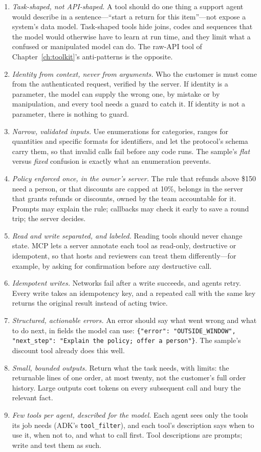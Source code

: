 \begin{enumerate}[leftmargin=2.0em, itemsep=3pt]
  \item \emph{Task-shaped, not API-shaped.} A tool should do one thing a support agent would describe in a sentence---``start a return for this item''---not expose a system's data model. Task-shaped tools hide joins, codes and sequences that the model would otherwise have to learn at run time, and they limit what a confused or manipulated model can do. The raw-API tool of Chapter~\ref{ch:toolkit}'s anti-patterns is the opposite.
  \item \emph{Identity from context, never from arguments.} Who the customer is must come from the authenticated request, verified by the server. If identity is a parameter, the model can supply the wrong one, by mistake or by manipulation, and every tool needs a guard to catch it. If identity is not a parameter, there is nothing to guard.
  \item \emph{Narrow, validated inputs.} Use enumerations for categories, ranges for quantities and specific formats for identifiers, and let the protocol's schema carry them, so that invalid calls fail before any code runs. The sample's \emph{flat} versus \emph{fixed} confusion is exactly what an enumeration prevents.
  \item \emph{Policy enforced once, in the owner's server.} The rule that refunds above \$150 need a person, or that discounts are capped at 10\%, belongs in the server that grants refunds or discounts, owned by the team accountable for it. Prompts may explain the rule; callbacks may check it early to save a round trip; the server decides.
  \item \emph{Read and write separated, and labeled.} Reading tools should never change state. MCP lets a server annotate each tool as read-only, destructive or idempotent, so that hosts and reviewers can treat them differently---for example, by asking for confirmation before any destructive call.
  \item \emph{Idempotent writes.} Networks fail after a write succeeds, and agents retry. Every write takes an idempotency key, and a repeated call with the same key returns the original result instead of acting twice.
  \item \emph{Structured, actionable errors.} An error should say what went wrong and what to do next, in fields the model can use: \texttt{\{"error": "OUTSIDE\_WINDOW", "next\_step": "Explain the policy; offer a person"\}}. The sample's discount tool already does this well.
  \item \emph{Small, bounded outputs.} Return what the task needs, with limits: the returnable lines of one order, at most twenty, not the customer's full order history. Large outputs cost tokens on every subsequent call and bury the relevant fact.
  \item \emph{Few tools per agent, described for the model.} Each agent sees only the tools its job needs (ADK's \texttt{tool\_filter}), and each tool's description says when to use it, when not to, and what to call first. Tool descriptions are prompts; write and test them as such.
\end{enumerate}

